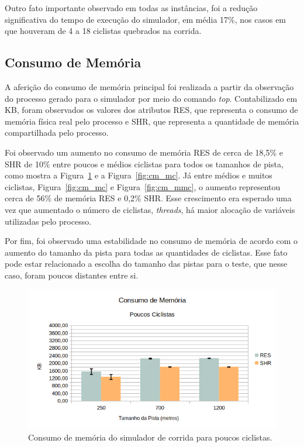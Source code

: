 \documentclass[12pt]{article}
\begin{document}
Outro fato importante observado em todas as instâncias, foi a redução significativa do tempo de execução do simulador, em média 17\%, nos casos em que houveram de 4 a 18 ciclistas quebrados na corrida.

\subsection{Consumo de Memória}

A aferição do consumo de memória principal foi realizada a partir da observação do processo gerado para o simulador por meio do comando \textit{top}. Contabilizado em KB, foram observados os valores dos atributos RES, que representa o consumo de memória física real pelo processo e SHR, que representa a quantidade de memória compartilhada pelo processo.

Foi observado um aumento no consumo de memória RES de cerca de 18,5\% e SHR de 10\% entre poucos e médios ciclistas para todos os tamanhos de pista, como mostra a Figura~\ref{fig:cm_pc} e a Figura~\ref{fig:cm_mc}. Já entre médios e muitos ciclistas, Figura~\ref{fig:cm_mc} e Figura~\ref{fig:cm_mmc}, o aumento representou cerca de 56\% de memória RES e 0,2\% SHR. Esse crescimento era esperado uma vez que aumentado o número de ciclistas, \textit{threads}, há maior alocação de variáveis utilizadas pelo processo.

Por fim, foi observado uma estabilidade no consumo de memória de acordo com o aumento do tamanho da pista para todas as quantidades de ciclistas. Esse fato pode estar relacionado a escolha do tamanho das pistas para o teste, que nesse caso, foram poucos distantes entre si.

\begin{figure}[H]
	\centering
	\includegraphics[width=1\textwidth]{cm_pc.png}
	\caption{Consumo de memória do simulador de corrida para poucos ciclistas.}
	\label{fig:cm_pc}
\end{figure}
\end{document}
